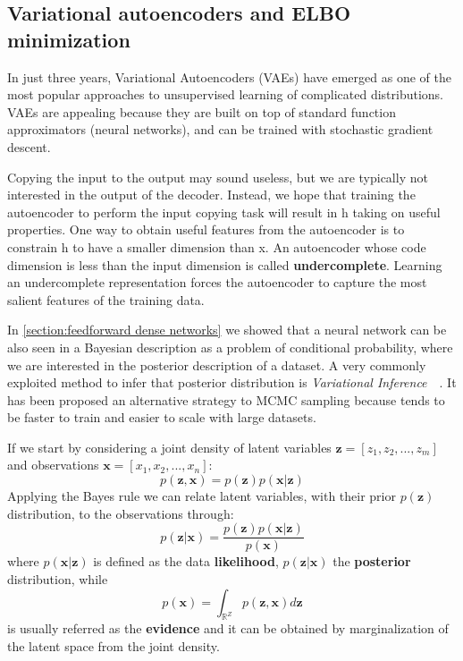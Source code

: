 \subsection{Variational autoencoders and ELBO minimization}
\label{section:VAE}
In just three years, Variational Autoencoders (VAEs) have emerged as one of the most popular approaches to unsupervised learning of complicated distributions. VAEs are appealing because they are built on top of standard function approximators (neural networks), and can be trained with stochastic gradient descent.

Copying the input to the output may sound useless, but we are typically not interested in the output of the decoder. Instead, we hope that training the autoencoder to perform the input copying task will result in h taking on useful properties. One way to obtain useful features from the autoencoder is to constrain h to have a smaller dimension than x. An autoencoder whose code dimension is less than the input dimension is called \textbf{undercomplete}. Learning an undercomplete representation forces the autoencoder to capture the most salient features of the training data.


In \cref{section:feedforward dense networks} we showed that a neural network can be also seen in a Bayesian description as a problem of conditional probability, where we are interested in the posterior description of a dataset. A very commonly exploited method to infer that posterior distribution is \textit{Variational Inference}~\cite{Jordan:1999:IVM:339248.339252}~\cite{MAL-001}. It has been proposed an alternative strategy to \ac{MCMC} sampling because tends to be faster to train and easier to scale with large datasets.

If we start by considering a joint density of latent variables $\bm{z} = [z_1, z_2, ...,z_m]$ and observations $\bm{x} = [x_1, x_2, ..., x_n]$:
\begin{equation}
    p(\bm{z},\bm{x}) = p(\bm{z}) p(\bm{x}|\bm{z})
\end{equation}
Applying the Bayes rule we can relate latent variables, with their prior $p(\bm{z})$ distribution, to the observations through:
\begin{equation}
    p(\bm{z}|\bm{x}) = \frac{p(\bm{z})p(\bm{x}|\bm{z})}{p(\bm{x})}
\end{equation}
where $p(\bm{x}|\bm{z})$ is defined as the data \textbf{likelihood}, $p(\bm{z}|\bm{x})$ the \textbf{posterior} distribution, while
\begin{equation}
    p(\bm{x}) = \int_{\mathbb{R}^Z} p(\bm{z}, \bm{x}) d\bm{z}
\end{equation}
is usually referred as the \textbf{evidence} and it can be obtained by marginalization of the latent space from the joint density.

